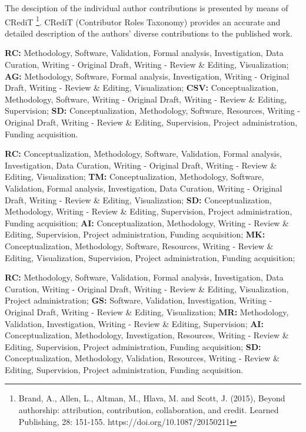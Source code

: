 The desciption of the individual author contributions is presented by means of CRediT \footnote{Brand, A., Allen, L., Altman, M., Hlava, M. and Scott, J. (2015), Beyond authorship: attribution, contribution, collaboration, and credit. Learned Publishing, 28: 151-155. https://doi.org/10.1087/20150211}. CRediT (Contributor Roles Taxonomy) provides an accurate and detailed description of the authors' diverse contributions to the published work.%

\paperitem %
	\textbf{RC:} Methodology, Software, Validation, Formal analysis, Investigation, Data Curation, Writing - Original Draft, Writing - Review \& Editing, Visualization;
	\textbf{AG:} Methodology, Software, Formal analysis, Investigation, Writing - Original Draft, Writing - Review \& Editing, Visualization;
	\textbf{CSV:} Conceptualization, Methodology, Software, Writing - Original Draft, Writing - Review \& Editing, Supervision;
	\textbf{SD:} Conceptualization, Methodology, Software, Resources, Writing - Original Draft, Writing - Review \& Editing, Supervision, Project administration, Funding acquisition.

\paperitem %
	\textbf{RC:} Conceptualization, Methodology, Software, Validation, Formal analysis, Investigation, Data Curation, Writing - Original Draft, Writing - Review \& Editing, Visualization;
	\textbf{TM:} Conceptualization, Methodology, Software, Validation, Formal analysis, Investigation, Data Curation, Writing - Original Draft, Writing - Review \& Editing, Visualization;
	\textbf{SD:} Conceptualization, Methodology, Writing - Review \& Editing, Supervision, Project administration, Funding acquisition;
	\textbf{AI:} Conceptualization, Methodology, Writing - Review \& Editing, Supervision, Project administration, Funding acquisition;
	\textbf{MK:} Conceptualization, Methodology, Software, Resources, Writing - Review \& Editing, Visualization, Supervision, Project administration, Funding acquisition;

\paperitem %
	\textbf{RC:} Methodology, Software, Validation, Formal analysis, Investigation, Data Curation, Writing - Original Draft, Writing - Review \& Editing, Visualization, Project administration;
	\textbf{GS:} Software, Validation, Investigation, Writing - Original Draft, Writing - Review \& Editing, Visualization;
	\textbf{MR:} Methodology, Validation, Investigation, Writing - Review \& Editing, Supervision;
	\textbf{AI:} Conceptualization, Methodology, Investigation, Resources, Writing - Review \& Editing, Supervision, Project administration, Funding acquisition;
	\textbf{SD:} Conceptualization, Methodology, Validation, Resources, Writing - Review \& Editing, Supervision, Project administration, Funding acquisition.


